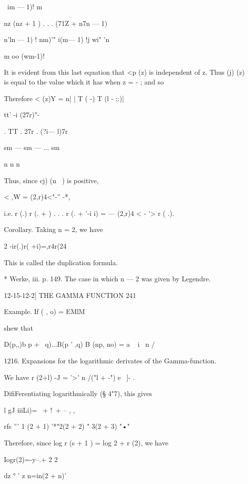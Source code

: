 \ im — 1)! m



nz (nz + 1 ) . . . (71Z + n7n — 1)



 n'ln — 1) ! nm)'" i(m— 1) !j wi" 'n



m oo (wm-1)!



It is evident from this last equation that <p (z) is independent of z.
Thus (j) (z) is equal to the value which it has when z = - ; and so

Therefore < (z)Y = n| | T ( -) T (l - ;:)|

tt' -i (27r)"-



. TT . 27r . (?i— l)7r

sm — sm — ... sm



n n n

Thus, since cj) (n~ ) is positive,

< ,W = (2,r)4<"-'' -*,

i.e. r (.) r (. + ) . . . r (. + '-i i) = — (2,r)4 < - '> r ( .).

Corollary. Taking n = 2, we have

2 -ir(.)r( +i)=,r4r(24

This is called the duplication formula.

* Werke, iii. p. 149. The case in which n — 2 was given by Legendre.



12-15-12-2] THE GAMMA FUNCTION 241

Example. If ( , o) = EMlM

shew that

D(p,,)b p + \ q)...B(p ' ,q) B (np, no) = a ~ i \ n /

1216. Expansions for the logarithmic derivates of the Gamma-function.

We have r (2+l) -J = '>' n /("l + -") e~ ]- .

DifiFerentiating logarithmically (§ 4"7), this gives

l gJ iiiLi)= \ + !\ + -- , ,

rfs ''' 1 (2 + 1) '*"2(2 + 2) " 3(2 + 3) "•"

Therefore, since log r (s + 1 ) = log 2 + r (2), we have

Iogr(2)=-y--.+ 2 2



dz ° ' z n=in(2 + n)'

